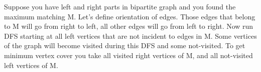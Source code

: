 \begin{large}
  Suppose you have left and right parts in bipartite graph and you found the maximum matching M. Let's define orientation of edges. Those edges that belong to M will go from right to left, all other edges will go from left to right. Now run DFS starting at all left vertices that are not incident to edges in M. Some vertices of the graph will become visited during this DFS and some not-visited. To get minimum vertex cover you take all visited right vertices of M, and all not-visited left vertices of M.
\end{large}
